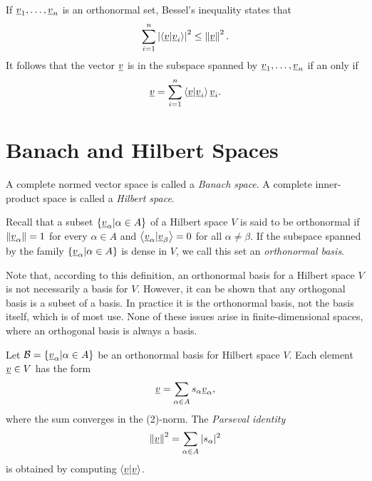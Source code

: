 If $\underline{v}_1, \ldots, \underline{v}_n$ is an orthonormal set, Bessel's inequality states that
\begin{equation*}
\sum_{i=1}^n \left| \left\langle \underline{v} | \underline{v}_i \right\rangle \right|^2 \leq \left\| \underline{v} \right\|^2.
\end{equation*}
It follows that the vector $\underline{v}$ is in the subspace spanned by $\underline{v}_1, \ldots, \underline{v}_n$ if an only if
\begin{equation*}
\underline{v} = \sum_{i=1}^n \left\langle \underline{v} | \underline{v}_i \right\rangle \underline{v}_i.
\end{equation*}


\section{Banach and Hilbert Spaces}

\begin{definition}
A complete normed vector space is called a \emph{Banach space}.
A complete inner-product space is called a \emph{Hilbert space}.
\end{definition}

\begin{definition}
Recall that a subset $\left\{ \underline{v}_{\alpha} | \alpha \in A \right\}$ of a Hilbert space $V$ is said to be orthonormal if $\left\| \underline{v}_{\alpha} \right\| = 1$ for every $\alpha \in A$ and $\left\langle \underline{v}_{\alpha} | \underline{v}_{\beta} \right\rangle = 0$ for all $\alpha \neq \beta$.
If the subspace spanned by the family $\left\{ \underline{v}_{\alpha} | \alpha \in A \right\}$ is dense in $V$, we call this set an \emph{orthonormal basis}.
\end{definition}

Note that, according to this definition, an orthonormal basis for a Hilbert space $V$ is not necessarily a basis for $V$.
However, it can be shown that any orthogonal basis is a subset of a basis.
In practice it is the orthonormal basis, not the basis itself, which is of most use.
None of these issues arise in finite-dimensional spaces, where an orthogonal basis is always a basis.

Let $\mathcal{B} = \left\{ \underline{v}_{\alpha} | \alpha \in A \right\}$ be an orthonormal basis for Hilbert space $V$.
Each element $\underline{v} \in V$ has the form
\begin{equation*}
\underline{v} = \sum_{\alpha \in A} s_{\alpha} \underline{v}_{\alpha},
\end{equation*}
where the sum converges in the (2)-norm.
The \emph{Parseval identity}
\begin{equation*}
\left\| \underline{v} \right\|^2 = \sum_{\alpha \in A} | s_{\alpha} |^2
\end{equation*}
is obtained by computing $\left\langle \underline{v} | \underline{v} \right\rangle$.


